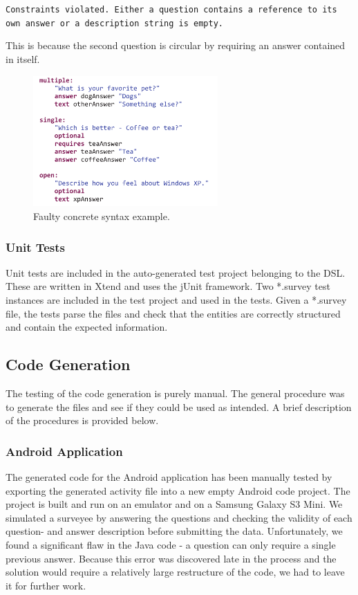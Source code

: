 \documentclass[runningheads]{llncs}
\begin{document}
\noindent
\texttt{Constraints violated. Either a question contains a reference to its own answer or a description string is empty.}

This is because the second question is circular by requiring an answer contained in itself.
\begin{figure}
\centering
\includegraphics[height=5cm]{concretefail}
\caption{Faulty concrete syntax example.}
\label{fig:concretefail}
\end{figure}
\subsubsection{Unit Tests}
Unit tests are included in the auto-generated test project belonging to the DSL. These are written in Xtend and uses the jUnit framework. Two *.survey test instances are included in the test project and used in the tests. Given a *.survey file, the tests parse the files and check that the entities are correctly structured and contain the expected information. 
\subsection{Code Generation}
The testing of the code generation is purely manual. The general procedure was to generate the files and see if they could be used as intended. A brief description of the procedures is provided below.
\subsubsection{Android Application}
The generated code for the Android application has been manually tested by exporting the generated activity file into a new empty Android code project. The project is built and run on an emulator and on a Samsung Galaxy S3 Mini. We simulated a surveyee by answering the questions and checking the validity of each question- and answer description before submitting the data. Unfortunately, we found a significant flaw in the Java code - a question can only require a single previous answer. Because this error was discovered late in the process and the solution would require a relatively large restructure of the code, we had to leave it for further work. 
\end{document}
